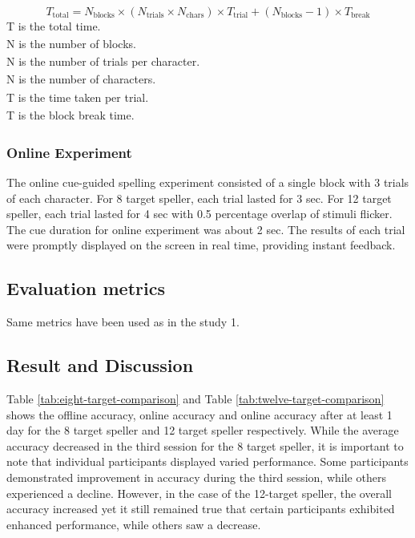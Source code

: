 \begin{equation}
    T_{\text{total}} = N_{\text{blocks}} \times (N_{\text{trials}} \times N_{\text{chars}}) \times T_{\text{trial}} + (N_{\text{blocks}} - 1) \times T_{\text{break}}
\end{equation}
T\textsubscript{} is the total time.\\
N\textsubscript{} is the number of blocks.\\
N\textsubscript{} is the number of trials per character.\\
N\textsubscript{} is the number of characters.\\
T\textsubscript{} is the time taken per trial.\\
T\textsubscript{} is the block break time.\\
    

\subsubsection{Online Experiment}
The online cue-guided spelling experiment consisted of a single block with 3 trials of each character. For 8 target speller, each trial lasted for 3 sec. For 12 target speller, each trial lasted for 4 sec with 0.5 percentage overlap of stimuli flicker. The cue duration for online experiment was about 2 sec. The results of each trial were promptly displayed on the screen in real time, providing instant feedback. 

\subsection{Evaluation metrics}
Same metrics have been used as in the study 1.

\subsection{Result and Discussion}  

Table \ref{tab:eight-target-comparison} and Table \ref{tab:twelve-target-comparison} shows the offline accuracy, online accuracy and online accuracy after at least 1 day for the 8 target speller and 12 target speller respectively. While the average accuracy decreased in the third session for the 8 target speller, it is important to note that individual participants displayed varied performance. Some participants demonstrated improvement in accuracy during the third session, while others experienced a decline. However, in the case of the 12-target speller, the overall accuracy increased yet it still remained true that certain participants exhibited enhanced performance, while others saw a decrease. 

